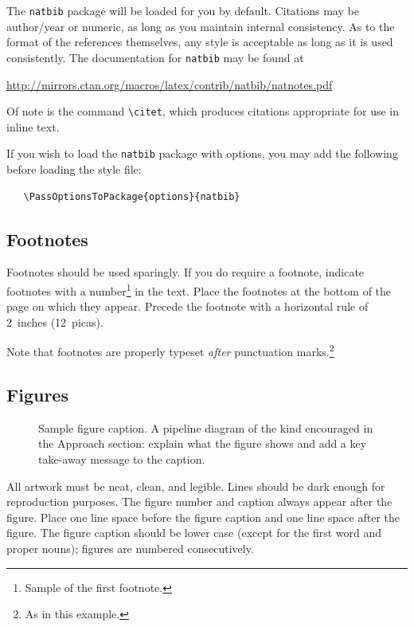 \documentclass{article}
\begin{document}
The \verb+natbib+ package will be loaded for you by default.  Citations may be
author/year or numeric, as long as you maintain internal consistency.  As to the
format of the references themselves, any style is acceptable as long as it is
used consistently. The documentation for \verb+natbib+ may be found at
\begin{center}
  \url{http://mirrors.ctan.org/macros/latex/contrib/natbib/natnotes.pdf}
\end{center}
Of note is the command \verb+\citet+, which produces citations appropriate for
use in inline text.

If you wish to load the \verb+natbib+ package with options, you may add the
following before loading the style file:
\begin{verbatim}
   \PassOptionsToPackage{options}{natbib}
\end{verbatim}


\subsection{Footnotes}


Footnotes should be used sparingly.  If you do require a footnote, indicate
footnotes with a number\footnote{Sample of the first footnote.} in the
text. Place the footnotes at the bottom of the page on which they appear.
Precede the footnote with a horizontal rule of 2~inches (12~picas).


Note that footnotes are properly typeset \emph{after} punctuation
marks.\footnote{As in this example.}


\subsection{Figures}


\begin{figure}
  \centering
  \fbox{\rule[-.5cm]{0cm}{4cm} \rule[-.5cm]{4cm}{0cm}}
  \caption{Sample figure caption. A pipeline diagram of the kind encouraged in the Approach section: explain what the figure shows and add a key take-away message to the caption.}
  \label{pipeline-figure}
\end{figure}


All artwork must be neat, clean, and legible. Lines should be dark enough for
reproduction purposes. The figure number and caption always appear after the
figure. Place one line space before the figure caption and one line space after
the figure. The figure caption should be lower case (except for the first word
and proper nouns); figures are numbered consecutively.
\end{document}
